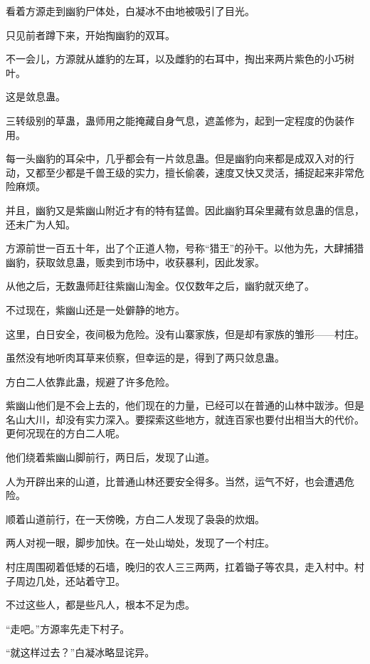 
\begin{this_body}

看着方源走到幽豹尸体处，白凝冰不由地被吸引了目光。

只见前者蹲下来，开始掏幽豹的双耳。

不一会儿，方源就从雄豹的左耳，以及雌豹的右耳中，掏出来两片紫色的小巧树叶。

这是敛息蛊。

三转级别的草蛊，蛊师用之能掩藏自身气息，遮盖修为，起到一定程度的伪装作用。

每一头幽豹的耳朵中，几乎都会有一片敛息蛊。但是幽豹向来都是成双入对的行动，又都至少都是千兽王级的实力，擅长偷袭，速度又快又灵活，捕捉起来非常危险麻烦。

并且，幽豹又是紫幽山附近才有的特有猛兽。因此幽豹耳朵里藏有敛息蛊的信息，还未广为人知。

方源前世一百五十年，出了个正道人物，号称“猎王”的孙干。以他为先，大肆捕猎幽豹，获取敛息蛊，贩卖到市场中，收获暴利，因此发家。

从他之后，无数蛊师赶往紫幽山淘金。仅仅数年之后，幽豹就灭绝了。

不过现在，紫幽山还是一处僻静的地方。

这里，白日安全，夜间极为危险。没有山寨家族，但是却有家族的雏形——村庄。

虽然没有地听肉耳草来侦察，但幸运的是，得到了两只敛息蛊。

方白二人依靠此蛊，规避了许多危险。

紫幽山他们是不会上去的，他们现在的力量，已经可以在普通的山林中跋涉。但是名山大川，却没有实力深入。要探索这些地方，就连百家也要付出相当大的代价。更何况现在的方白二人呢。

他们绕着紫幽山脚前行，两日后，发现了山道。

人为开辟出来的山道，比普通山林还要安全得多。当然，运气不好，也会遭遇危险。

顺着山道前行，在一天傍晚，方白二人发现了袅袅的炊烟。

两人对视一眼，脚步加快。在一处山坳处，发现了一个村庄。

村庄周围砌着低矮的石墙，晚归的农人三三两两，扛着锄子等农具，走入村中。村子周边几处，还站着守卫。

不过这些人，都是些凡人，根本不足为虑。

“走吧。”方源率先走下村子。

“就这样过去？”白凝冰略显诧异。


\end{this_body}
